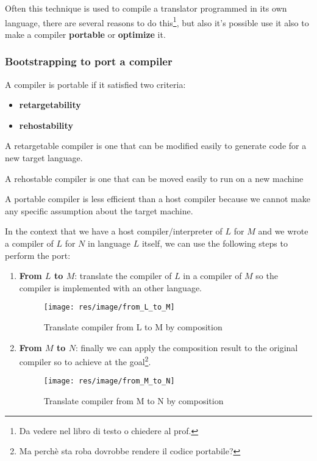 Often this technique is used to compile a translator programmed in its own
language, there are several reasons to do this\footnote{Da vedere nel libro di
testo o chiedere al prof.}, but also it's possible use it also to make a
compiler \textbf{portable} or \textbf{optimize} it.

\subsubsection{Bootstrapping to port a compiler}
A compiler is portable if it satisfied two criteria:
\begin{itemize}
\item \textbf{retargetability}
\item \textbf{rehostability}
\end{itemize}

\begin{definition}
A retargetable compiler is one that can be modified easily to generate code for
a new target language.
\end{definition}

\begin{definition}
A rehostable compiler is one that can be moved easily to run on a new machine
\end{definition}

A portable compiler is less efficient than a host compiler because we cannot
make any specific assumption about the target machine.

In the context that we have a host compiler/interpreter of $L$ for $M$ and we
wrote a compiler of $L$ for $N$ in language $L$ itself, we can use the following
steps to perform the port:
\begin{enumerate}
\item \textbf{From $L$ to $M$}: translate the compiler of $L$ in a compiler of
$M$ so the compiler is implemented with an other language.

\begin{figure}[H]
\begin{center}
\texttt{[image: res/image/from\_L\_to\_M]}
\caption{Translate compiler from L to M by composition}
\label{from_L_to_M}
\end{center}
\end{figure}

\item \textbf{From $M$ to $N$}: finally we can apply the composition result to
the original compiler so to achieve at the goal\footnote{Ma perchè sta roba
dovrobbe rendere il codice portabile?}.
\begin{figure}[H]
\begin{center}
\texttt{[image: res/image/from\_M\_to\_N]}
\caption{Translate compiler from M to N by composition}
\label{from_M_to_N}
\end{center}
\end{figure}
\end{enumerate}

